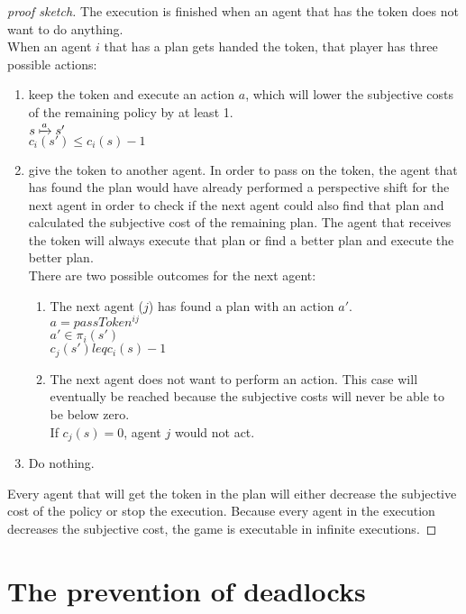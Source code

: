 \begin{proof}[proof sketch]
  The execution is finished when an agent that has the token does not want to do anything. \\
  When an agent $i$ that has a plan gets handed the token, that player has three possible actions:
  \begin{enumerate}
    \item keep the token and execute an action $a$, which will lower the subjective costs of the remaining policy by at least 1. \\
      $s \xmapsto{a} s'$ \\
      $c_i(s') \leq c_i(s)-1$

    \item give the token to another agent. In order to pass on the token, the agent that has found the plan would have already performed a perspective shift for the next agent in order to check if the next agent could also find that plan and calculated the subjective cost of the remaining plan. The agent that receives the token will always execute that plan or find a better plan and execute the better plan. \\
    There are two possible outcomes for the next agent:
    \begin{enumerate}
      \item The next agent ($j$) has found a plan with an action $a'$. \\
        $a=passToken^{ij}$ \\
        $a' \in \pi_i(s')$ \\
        $c_j(s') leq c_i(s)-1$
      \item The next agent does not want to perform an action. This case will eventually be reached because the subjective costs will never be able to be below zero. \\
      If $c_j(s)=0$, agent $j$ would not act.
    \end{enumerate}

    \item Do nothing.

  \end{enumerate}
  Every agent that will get the token in the plan will either decrease the subjective cost of the policy or stop the execution. Because every agent in the execution decreases the subjective cost, the game is executable in infinite executions.
\end{proof}

\section{The prevention of deadlocks}

